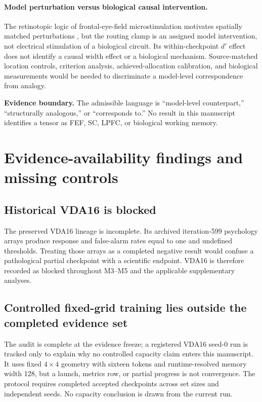 \documentclass[11pt,a4paper]{article}
\newcommand{\boundary}[1]{\par\smallskip\noindent\colorbox{VdaLight}{\parbox{0.96\linewidth}{\textbf{Evidence boundary.} #1}}\par\smallskip}
\begin{document}
\paragraph{Model perturbation versus biological causal intervention.} The retinotopic logic of frontal-eye-field microstimulation motivates spatially matched perturbations \cite{moore2003}, but the routing clamp is an assigned model intervention, not electrical stimulation of a biological circuit. Its within-checkpoint $d'$ effect does not identify a causal width effect or a biological mechanism. Source-matched location controls, criterion analysis, achieved-allocation calibration, and biological measurements would be needed to discriminate a model-level correspondence from analogy.

\boundary{The admissible language is ``model-level counterpart,'' ``structurally analogous,'' or ``corresponds to.'' No result in this manuscript identifies a tensor as FEF, SC, LPFC, or biological working memory.}

\section{Evidence-availability findings and missing controls}
\subsection{Historical VDA16 is blocked}
The preserved VDA16 lineage is incomplete. Its archived iteration-599 psychology arrays produce response and false-alarm rates equal to one and undefined thresholds. Treating those arrays as a completed negative result would confuse a pathological partial checkpoint with a scientific endpoint. VDA16 is therefore recorded as blocked throughout M3--M5 and the applicable supplementary analyses.

\subsection{Controlled fixed-grid training lies outside the completed evidence set}
The audit is complete at the evidence freeze; a registered VDA16 seed-0 run is tracked only to explain why no controlled capacity claim enters this manuscript. It uses fixed $4\times4$ geometry with sixteen tokens and runtime-resolved memory width 128, but a launch, metrics row, or partial progress is not convergence. The protocol requires completed accepted checkpoints across set sizes and independent seeds. No capacity conclusion is drawn from the current run.
\end{document}
